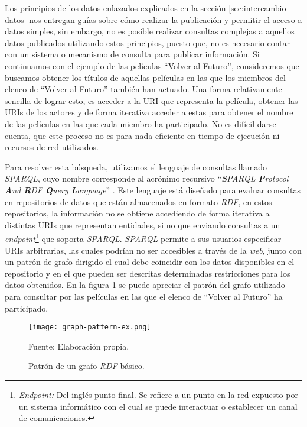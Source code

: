 Los principios de los datos enlazados explicados en la sección \ref{sec:intercambio-datos} nos entregan guías sobre cómo realizar la publicación y permitir el acceso a datos simples, sin embargo, no es posible realizar consultas complejas a aquellos datos publicados utilizando estos principios, puesto que, no es necesario contar con un sistema o mecanismo de consulta para publicar información. Si continuamos con el ejemplo de las películas ``Volver al Futuro'', consideremos que buscamos obtener los títulos de aquellas películas en las que los miembros del elenco de ``Volver al Futuro'' también han actuado. Una forma relativamente sencilla de lograr esto, es acceder a la URI que representa la película, obtener las URIs de los actores y de forma iterativa acceder a estas para obtener el nombre de las películas en las que cada miembro ha participado. No es difícil darse cuenta, que este proceso no es para nada eficiente en tiempo de ejecución ni recursos de red utilizados.

Para resolver esta búsqueda, utilizamos el lenguaje de consultas llamado \textit{SPARQL}, cuyo nombre corresponde al acrónimo recursivo ``\textit{\textbf{S}PARQL \textbf{P}rotocol \textbf{A}nd \textbf{R}DF \textbf{Q}uery \textbf{L}anguage}'' \cite{world2013sparql}. Este lenguaje está diseñado para evaluar consultas en repositorios de datos que están almacenados en formato \textit{RDF}, en estos repositorios, la información no se obtiene accediendo de forma iterativa a distintas URIs que representan entidades, si no que enviando consultas a un \textit{endpoint}\footnote{\textit{Endpoint:} Del inglés punto final. Se refiere a un punto en la red expuesto por un sistema informático con el cual se puede interactuar o establecer un canal de comunicaciones.} que soporta \textit{SPARQL}. \textit{SPARQL} permite a sus usuarios especificar URIs arbitrarias, las cuales podrían no ser accesibles a través de la \textit{web}, junto con un patrón de grafo dirigido el cual debe coincidir con los datos disponibles en el repositorio y en el que pueden ser descritas determinadas restricciones para los datos obtenidos. En la figura \ref{fig:graph-pattern-ex} se puede apreciar el patrón del grafo utilizado para consultar por las películas en las que el elenco de ``Volver al Futuro'' ha participado.

\begin{figure}
    \centering
    \texttt{[image: graph-pattern-ex.png]}
    \caption{Patrón de un grafo \textit{RDF} básico. } Fuente: Elaboración
    propia.
    \label{fig:graph-pattern-ex}
\end{figure}

